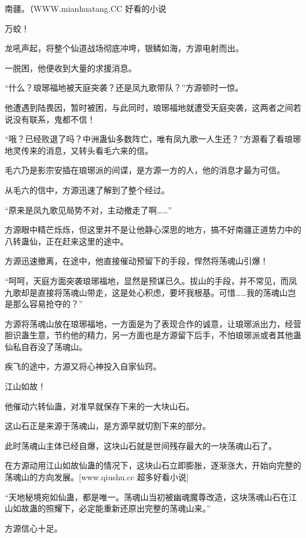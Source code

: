 
\begin{this_body}

南疆。（WWW.mianhuatang.CC 好看的小说

万蛟！

龙吼声起，将整个仙道战场彻底冲垮，银鳞如海，方源电射而出。

一脱困，他便收到大量的求援消息。

“什么？琅琊福地被天庭突袭？还是凤九歌带队？”方源顿时一惊。

他遭遇到陆畏因，暂时被困，与此同时，琅琊福地就遭受天庭突袭，这两者之间若说没有联系，鬼都不信！

“哦？已经败退了吗？中洲蛊仙多数阵亡，唯有凤九歌一人生还？”方源看了看琅琊地灵传来的消息，又转头看毛六来的信。

毛六乃是影宗安插在琅琊派的间谍，是方源一方的人，他的消息才最为可信。

从毛六的信中，方源迅速了解到了整个经过。

“原来是凤九歌见局势不对，主动撤走了啊……”

方源眼中精芒烁烁，但这里并不是让他静心深思的地方，搞不好南疆正道势力中的八转蛊仙，正在赶来这里的途中。

方源迅速撤离，在途中，他直接催动预留下的手段，悍然将荡魂山引爆！

“呵呵，天庭方面突袭琅琊福地，显然是预谋已久。拔山的手段，并不常见，而凤九歌却是直接将荡魂山带走，这是处心积虑，要坏我根基。可惜……我的荡魂山岂是那么容易抢夺的？”

方源将荡魂山放在琅琊福地，一方面是为了表现合作的诚意，让琅琊派出力，经营胆识蛊生意，节约他的精力，另一方面也是方源留下后手，不怕琅琊派或者其他蛊仙私自吞没了荡魂山。

疾飞的途中，方源又将心神投入自家仙窍。

江山如故！

他催动六转仙蛊，对准早就保存下来的一大块山石。

这山石正是来源于荡魂山，是方源早就切割下来的部分。

此时荡魂山主体已经自爆，这块山石就是世间残存最大的一块荡魂山石了。

在方源动用江山如故仙蛊的情况下，这块山石立即膨胀，逐渐涨大，开始向完整的荡魂山的方向发展。[www.qiushu.cc 超多好看小说]

“天地秘境宛如仙蛊，都是唯一。荡魂山当初被幽魂魔尊改造，这块荡魂山石在江山如故蛊的照耀下，必定能重新还原出完整的荡魂山来。”

方源信心十足。


\end{this_body}
